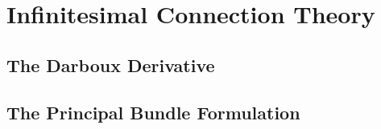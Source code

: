 \section{Infinitesimal Connection Theory}

\subsection{The Darboux Derivative}

\subsection{}

\subsection{The Principal Bundle Formulation}

\subsection{}

\subsection{}